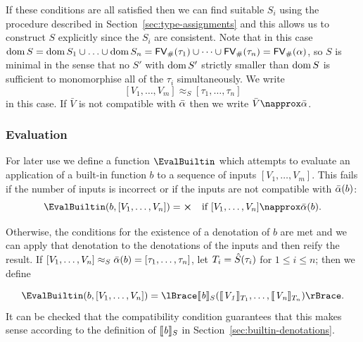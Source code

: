 \noindent If these conditions are all satisfied then we can find suitable $S_i$
using the procedure described in Section~\ref{sec:type-assignments} and this
allows us to construct $S$ explicitly since the $S_i$ are consistent.  Note that
in this case $\operatorname{dom} S = \operatorname{dom} S_1 \cup \ldots \cup \operatorname{dom} S_n = \mathsf{FV}_{\#}(\tau_1) \cup
\cdots \cup \mathsf{FV}_{\#}(\tau_n) = \mathsf{FV}_{\#}(\alpha)$, so $S$ is minimal in the sense that no
$S'$ with $\operatorname{dom} S'$ strictly smaller than $\operatorname{dom} S$ is sufficient
to monomorphise all of the $\tau_i$ simultaneously.  We write
$$
[V_1, \ldots, V_m] \approx_S [\tau_1, \ldots, \tau_n]
$$
in this case.  If $\bar{V}$ is not compatible with $\bar{\alpha}$ then we write
$\bar{V} \napprox \alphabar$.%

\subsubsection{Evaluation}
\label{sec:eval}
For later use we define a function $\EvalBuiltin$ which attempts to evaluate an
application of a built-in function $b$ to a sequence of inputs $[V_1, \ldots,
  V_m]$.  This fails if the number of inputs is incorrect or if the inputs are
not compatible with $\bar{\alpha}(b)$:
$$
\EvalBuiltin(b,[V_1, \ldots, V_n]) = \errorX \quad \text{if $[V_1, \ldots, V_n] \napprox \alphabar(b)$}.
$$

\noindent Otherwise, the conditions for the existence of a denotation of $b$ are
met and we can apply that denotation to the denotations of the inputs and then
reify the result. If $[V_1, \ldots, V_n] \approx_S \bar{\alpha}(b) = [\tau_1,
  \ldots, \tau_n]$, let $T_i = \hat{S}(\tau_i)$ for $1 \leq i \leq n$; then we
define

$$
\EvalBuiltin(b,[V_1, \ldots, V_n]) = \reify{\denote{b}_S (\denote{V_1}_{T_1}, \ldots, \denote{V_n}_{T_n})}.
$$%
%
%
\noindent It can be checked that the compatibility condition guarantees that
this makes sense according to the definition of $\llbracket\mathit{b}\rrbracket_S$ in
Section~\ref{sec:builtin-denotations}.

